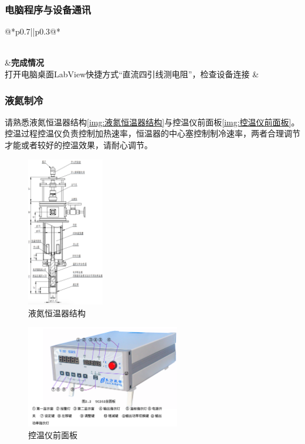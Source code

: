 \documentclass{spaexp}
\begin{document}
            \subsubsection{电脑程序与设备通讯}
                \begin{longtable}{@{*}p{}||p{}@{*}}
                    \caption{电脑程序与设备通讯操作步骤\label{tab:电脑程序与设备通讯}}\\
                    \hline\hline
                    &\textbf{完成情况}\\
                    \hline\hline
                    打开电脑桌面LabView快捷方式“直流四引线测电阻”，检查设备连接 & \\ \hline
                \end{longtable}

            \subsubsection{液氮制冷}
                请熟悉液氮恒温器结构\autoref{img:液氮恒温器结构}与控温仪前面板\autoref{img:控温仪前面板}。控温过程控温仪负责控制加热速率，恒温器的中心塞控制制冷速率，两者合理调节
                才能或者较好的控温效果，请耐心调节。

                \begin{figure}
                    \ct
                    \caption{液氮恒温器结构}
                    \label{img:液氮恒温器结构}
                    \includegraphics[width = 0.3\textwidth]{TempertureKeeper.png}
                \end{figure}
                \begin{figure}
                    \ct
                    \caption{控温仪前面板}
                    \label{img:控温仪前面板}
                    \includegraphics[width = 0.6\textwidth]{PIDFront.png}
                \end{figure}
\end{document}
